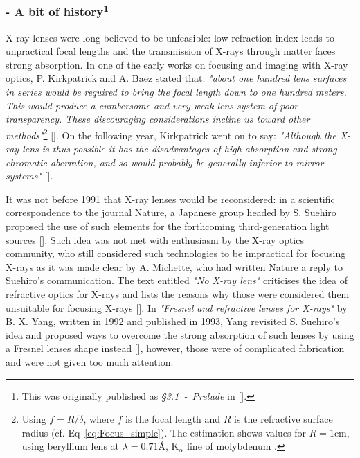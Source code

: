 \begin{refsection}
\subsubsection*{- A bit of history\footnote{This was originally published as \textit{§3.1~-~Prelude} in [\cite{Celestre2017}].}}
X-ray lenses were long believed to be unfeasible: low refraction index leads to unpractical focal lengths and the transmission of X-rays through matter faces strong absorption. In one of the early works on focusing and imaging with X-ray optics, P. Kirkpatrick and A. Baez stated that: \textit{"about one hundred lens surfaces in series would be required to bring the focal length down to one hundred meters. This would produce a cumbersome and very weak lens system of poor transparency. These discouraging considerations incline us toward other methods"}\footnote{Using $f=R/\delta$, where $f$ is the focal length and $R$ is the refractive surface radius (cf. Eq~\ref{eq:Focus_simple}). The estimation shows values for $R=1$cm, using beryllium lens at $\lambda=0.71$\r{A}, K$_{\alpha}$ line of molybdenum \cite{Kirkpatrick1948}.} [\cite{Kirkpatrick1948}]. On the following year, Kirkpatrick went on to say: \textit{"Although the X-ray lens is thus possible it has the disadvantages of high absorption and strong chromatic aberration, and so would probably be generally inferior to mirror systems"} [\cite{Kirkpatrick1949}]. 

It was not before 1991 that X-ray lenses would be reconsidered: in a scientific correspondence to the journal Nature, a Japanese group headed by S. Suehiro proposed the use of such elements for the forthcoming third-generation light sources [\cite{Suehiro1991}]. Such idea was not met with enthusiasm by the X-ray optics community, who still considered such technologies to be impractical for focusing X-rays as it was made clear by A. Michette, who had written Nature a reply to Suehiro's communication. The text entitled \textit{"No X-ray lens"} criticises the idea of refractive optics for X-rays and lists the reasons why those were considered them unsuitable for focusing X-rays [\cite{Michette1991}]. In \textit{"Fresnel and refractive lenses for X-rays"} by B. X. Yang, written in 1992 and published in 1993, Yang revisited S. Suehiro's idea and proposed ways to overcome the strong absorption of such lenses by using a Fresnel lenses shape instead [\cite{Yang1993}], however, those were of complicated fabrication and were not given too much attention. 


\end{refsection}
